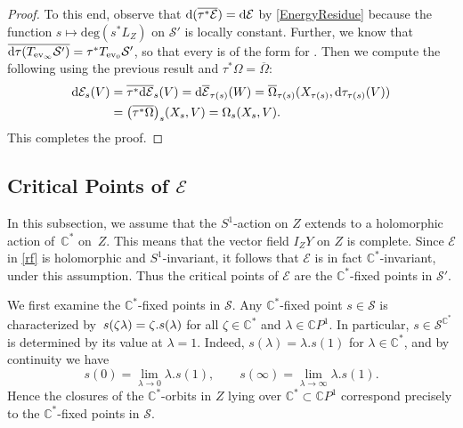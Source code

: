 \documentclass[pdftex]{sigma}
\numberwithin{equation}{section}
\theoremstyle{definition}
\newcommand\C{{\mathbb C}}
\begin{document}
\begin{proof}
To this end, observe that ${\rm d}(\overline{\tau^*\mathcal{E}}) = {\rm d}\mathcal{E}$ by \eqref{EnergyResidue} because
the function $s \longmapsto \mathrm{deg}(s^*L_Z)$ on ${\mathcal S}'$ is locally constant.
Further, we know that $\overline{{\rm d}\tau(T_{\operatorname{ev}_\infty}\mathcal S')} = \tau^*T_{\operatorname{ev}_0}\mathcal S'$,
so that every  is of the form  for .
Then we compute the following using the previous result and $\tau^*\Omega = \overline{\Omega}$:
\begin{align*}
{\rm d}\mathcal{E}_s(V) & = \overline{\tau^*{\rm d}\mathcal{E}}_{s}(V) = {\rm d}\overline{\mathcal{E}}_{\tau(s)} (W) = \overline{\Omega}_{\tau(s)}(X_{\tau(s)}, {\rm d}\tau_{\tau(s)}(V)) \\
	&= \bigl(\overline{\tau^*\Omega}\bigr)_s(X_s, V) = \Omega_s(X_s, V).
\end{align*}
This completes the proof.
\end{proof}

\subsection[Critical Points of E]{Critical Points of $\boldsymbol{\mathcal E}$}\label{ss:C*}

In this subsection, we assume that the $S^1$-action on $Z$ extends to a holomorphic action of~$\C^*$
on~$Z$. This means that the vector field $I_ZY$ on $Z$ is complete. Since $\mathcal E$
in \eqref{rf} is holomorphic and $S^1$-invariant,
it follows that $\mathcal E$ is in fact $\C^*$-invariant, under this assumption.
Thus the critical points of $\mathcal E$ are the $\C^*$-fixed points in $\mathcal S'$.

We first examine the $\C^*$-fixed points in $\mathcal{S}$.
Any $\C^*$-fixed point $s\in \mathcal S$ is characterized by~${%
s(\zeta\lambda) = \zeta.s(\lambda)}
$
for all $\zeta \in \C^*$ and $\lambda \in \mathbb CP^1$.
In particular, $s \in \mathcal{S}^{\C^*}$ is determined by its value at $\lambda = 1$.
Indeed, $s(\lambda) = \lambda.s(1)$ for $\lambda \in \C^*$, and by continuity we have
\begin{equation}\label{eq:fixedpointlimits}
s(0) = \lim_{\lambda\to 0} \lambda.s(1),\qquad s(\infty) = \lim_{\lambda \to \infty} \lambda.s(1).
\end{equation}
Hence the closures of the $\C^*$-orbits in $Z$ lying over $\C^* \subset \mathbb CP^1$ correspond precisely to the
$\C^*$-fixed points in $\mathcal{S}$.
\end{document}
